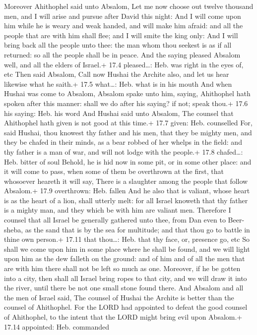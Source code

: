  Moreover Ahithophel said unto Absalom, Let me now choose
out twelve thousand men, and I will arise and pursue after David this
night:  And I will come upon him while he is weary and weak
handed, and will make him afraid: and all the people that are with him
shall flee; and I will smite the king only:  And I will
bring back all the people unto thee: the man whom thou seekest is as if
all returned: so all the people shall be in peace.  And the
saying pleased Absalom well, and all the elders of Israel.+ 17.4
pleased\ldots: Heb. was right in the eyes of, etc  Then said
Absalom, Call now Hushai the Archite also, and let us hear likewise what
he saith.+ 17.5 what\ldots: Heb. what is in his mouth  And
when Hushai was come to Absalom, Absalom spake unto him, saying,
Ahithophel hath spoken after this manner: shall we do after his saying?
if not; speak thou.+ 17.6 his saying: Heb. his word  And
Hushai said unto Absalom, The counsel that Ahithophel hath given is not
good at this time.+ 17.7 given: Heb. counselled  For, said
Hushai, thou knowest thy father and his men, that they be mighty men,
and they be chafed in their minds, as a bear robbed of her whelps in the
field: and thy father is a man of war, and will not lodge with the
people.+ 17.8 chafed\ldots: Heb. bitter of soul  Behold, he
is hid now in some pit, or in some other place: and it will come to
pass, when some of them be overthrown at the first, that whosoever
heareth it will say, There is a slaughter among the people that follow
Absalom.+ 17.9 overthrown: Heb. fallen  And he also that is
valiant, whose heart is as the heart of a lion, shall utterly melt: for
all Israel knoweth that thy father is a mighty man, and they which be
with him are valiant men.  Therefore I counsel that all
Israel be generally gathered unto thee, from Dan even to Beer-sheba, as
the sand that is by the sea for multitude; and that thou go to battle in
thine own person.+ 17.11 that thou\ldots: Heb. that thy face, or,
presence go, etc  So shall we come upon him in some place
where he shall be found, and we will light upon him as the dew falleth
on the ground: and of him and of all the men that are with him there
shall not be left so much as one.  Moreover, if he be
gotten into a city, then shall all Israel bring ropes to that city, and
we will draw it into the river, until there be not one small stone found
there.  And Absalom and all the men of Israel said, The
counsel of Hushai the Archite is better than the counsel of Ahithophel.
For the LORD had appointed to defeat the good counsel of Ahithophel, to
the intent that the LORD might bring evil upon Absalom.+ 17.14
appointed: Heb. commanded

